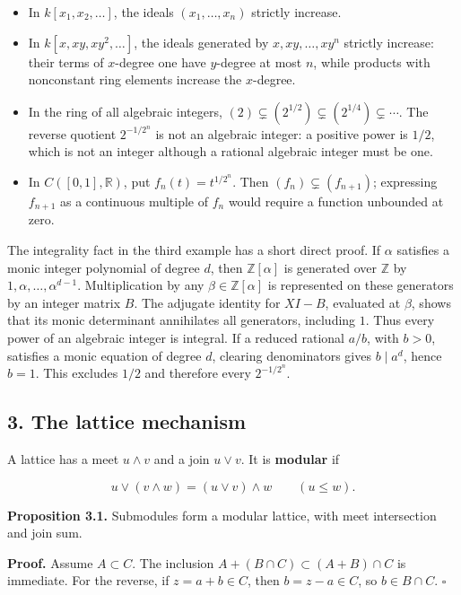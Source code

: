 \documentclass[
]{article}
\providecommand{\tightlist}{%
  \setlength{\itemsep}{0pt}\setlength{\parskip}{0pt}}
\begin{document}
\begin{itemize}
\tightlist
\item
  In \(k[x_1,x_2,\ldots]\), the ideals \((x_1,\ldots,x_n)\) strictly
  increase.
\item
  In \(k[x,xy,xy^2,\ldots]\), the ideals generated by
  \(x,xy,\ldots,xy^n\) strictly increase: their terms of \(x\)-degree
  one have \(y\)-degree at most \(n\), while products with nonconstant
  ring elements increase the \(x\)-degree.
\item
  In the ring of all algebraic integers,
  \((2)\subsetneq(2^{1/2})\subsetneq(2^{1/4})\subsetneq\cdots\). The
  reverse quotient \(2^{-1/2^n}\) is not an algebraic integer: a
  positive power is \(1/2\), which is not an integer although a rational
  algebraic integer must be one.
\item
  In \(C([0,1],\mathbb R)\), put \(f_n(t)=t^{1/2^n}\). Then
  \((f_n)\subsetneq(f_{n+1})\); expressing \(f_{n+1}\) as a continuous
  multiple of \(f_n\) would require a function unbounded at zero.
\end{itemize}

The integrality fact in the third example has a short direct proof. If
\(\alpha\) satisfies a monic integer polynomial of degree \(d\), then
\(\mathbb Z[\alpha]\) is generated over \(\mathbb Z\) by
\(1,\alpha,\ldots,\alpha^{d-1}\). Multiplication by any
\(\beta\in\mathbb Z[\alpha]\) is represented on these generators by an
integer matrix \(B\). The adjugate identity for \(XI-B\), evaluated at
\(\beta\), shows that its monic determinant annihilates all generators,
including \(1\). Thus every power of an algebraic integer is integral.
If a reduced rational \(a/b\), with \(b>0\), satisfies a monic equation
of degree \(d\), clearing denominators gives \(b\mid a^d\), hence
\(b=1\). This excludes \(1/2\) and therefore every \(2^{-1/2^n}\).

\subsection{3. The lattice mechanism}\label{the-lattice-mechanism}

A lattice has a meet \(u\wedge v\) and a join \(u\vee v\). It is
\textbf{modular} if

\[
u\vee(v\wedge w)=(u\vee v)\wedge w\qquad(u\leq w).
\]

\textbf{Proposition 3.1.} Submodules form a modular lattice, with meet
intersection and join sum.

\textbf{Proof.} Assume \(A\subset C\). The inclusion
\(A+(B\cap C)\subset(A+B)\cap C\) is immediate. For the reverse, if
\(z=a+b\in C\), then \(b=z-a\in C\), so \(b\in B\cap C\). \(\square\)
\end{document}
